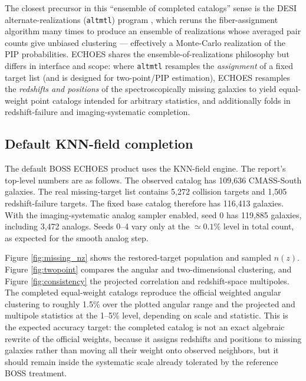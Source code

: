 \documentclass[apj]{emulateapj}
\begin{document}
The closest precursor in this ``ensemble of completed catalogs'' sense is the
DESI alternate-realizations (\texttt{altmtl}) program \citep{Lasker2025}, which
reruns the fiber-assignment algorithm many times to produce an ensemble of
realizations whose averaged pair counts give unbiased clustering --- effectively
a Monte-Carlo realization of the PIP probabilities.  ECHOES shares the
ensemble-of-realizations philosophy but differs in interface and scope: where
\texttt{altmtl} resamples the \emph{assignment} of a fixed target list (and is
designed for two-point/PIP estimation), ECHOES resamples the \emph{redshifts and
positions} of the spectroscopically missing galaxies to yield equal-weight point
catalogs intended for arbitrary statistics, and additionally folds in
redshift-failure and imaging-systematic completion.

\subsection{Default KNN-field completion}
\label{subsec:boss_default}

The default BOSS ECHOES product uses the KNN-field engine.  The report's top-level
numbers are as follows.  The observed catalog has 109,636 CMASS-South galaxies.
The real missing-target list contains 5,272 collision targets and 1,505
redshift-failure targets.  The fixed base catalog therefore has 116,413
galaxies.  With the imaging-systematic analog sampler enabled, seed 0 has
119,885 galaxies, including 3,472 analogs.  Seeds 0--4 vary only at the
$\simeq 0.1\%$ level in total count, as expected for the smooth analog step.

Figure \ref{fig:missing_nz} shows the restored-target population and sampled
$n(z)$.  Figure \ref{fig:twopoint} compares the angular and two-dimensional
clustering, and Figure \ref{fig:consistency} the projected correlation and
redshift-space multipoles.  The completed equal-weight catalogs reproduce the
official weighted angular clustering to roughly 1.5\% over the plotted angular
range and the projected and multipole statistics at the 1--5\% level, depending
on scale and statistic.  This is the expected accuracy target: the completed catalog is
not an exact algebraic rewrite of the official weights, because it assigns
redshifts and positions to missing galaxies rather than moving all their weight
onto observed neighbors, but it should remain inside the systematic scale
already tolerated by the reference BOSS treatment.
\end{document}
